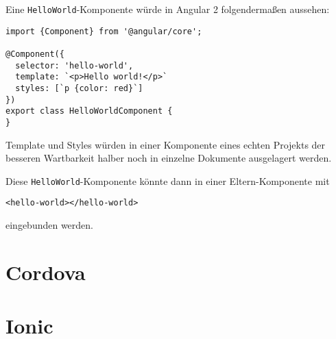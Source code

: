 Eine \texttt{HelloWorld}-Komponente würde in Angular 2 folgendermaßen aussehen:
\begin{codebox}
\begin{lstlisting}[style=typescript]
import {Component} from '@angular/core';

@Component({
  selector: 'hello-world',
  template: `<p>Hello world!</p>`
  styles: [`p {color: red}`]
})
export class HelloWorldComponent {
}
\end{lstlisting}
\end{codebox}

Template und Styles würden in einer Komponente eines echten Projekts der besseren Wartbarkeit halber noch in einzelne Dokumente ausgelagert werden.

Diese \texttt{HelloWorld}-Komponente könnte dann in einer Eltern-Komponente mit
\lstset{language=HTML}
\begin{codebox}
\begin{lstlisting}
<hello-world></hello-world>
\end{lstlisting}
\end{codebox}
eingebunden werden.

\section{Cordova}
\section{Ionic}












